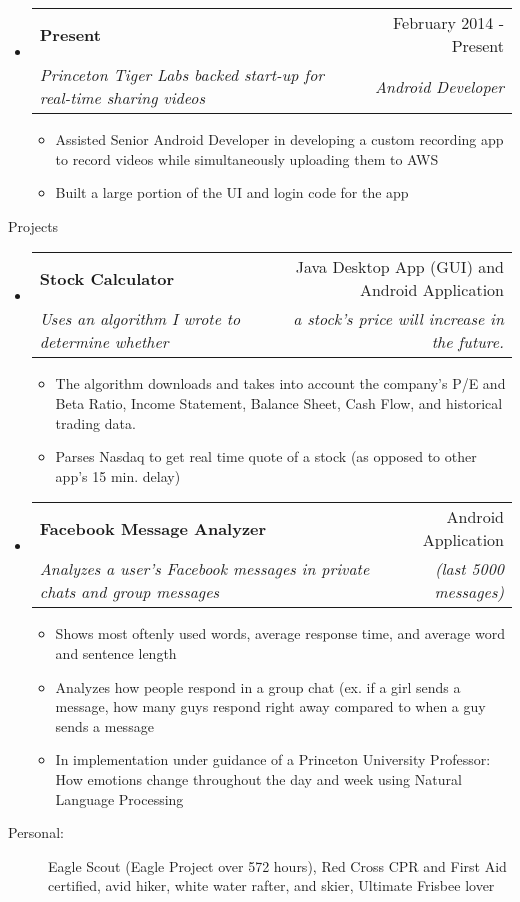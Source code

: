 \documentclass[letterpaper,11pt]{article}
\makeatletter
\newcommand{\resitem}[1]{\item #1 \vspace{-2pt}}
\newcommand{\resheading}[1]{{\large \parashade[.9]{sharpcorners}{\textbf{#1 \vphantom{p\^{E}}}}}}
\newcommand{\ressubheading}[4]{
\begin{tabular*}{6.5in}{l@{\extracolsep{\fill}}r}
		\textbf{#1} & #2 \\
		\textit{#3} & \textit{#4} \\
\end{tabular*}\vspace{-6pt}}
\makeatother
\begin{document}
\begin{itemize}
\item
	\ressubheading{Present}{February 2014 - Present}
		{Princeton Tiger Labs backed start-up for real-time 				sharing videos} {Android Developer}
		\begin {itemize}
		\resitem{Assisted Senior Android Developer in 						developing a custom recording app to record videos 				while simultaneously uploading them to AWS}
		\resitem{Built a large portion of the UI and login code 			for the app}
		\end{itemize}
\end{itemize}


\begin{description} 
	\item[Projects] 
\end{description}

\begin{itemize}

\item
	\ressubheading{Stock Calculator}{Java Desktop App (GUI) and 		Android Application}{Uses an algorithm I wrote to 				determine whether}{a stock's price will increase in the 		future.\space\space\space\space\space\space\space\space			\space}
	\begin{itemize}
		\resitem{The algorithm downloads and takes into account 			the company’s P/E and Beta Ratio, Income Statement, 			Balance Sheet, Cash Flow, and historical trading 					data.}
		\resitem{Parses Nasdaq to get real time quote of a 					stock (as opposed to other app's 15 min. delay)}
	\end{itemize}
	
\item
	\ressubheading{Facebook Message Analyzer}
		{Android Application}{Analyzes a user’s Facebook 					messages in private chats and group messages}{(last 				5000 messages)\space\space\space\space\space\space				\space\space\space}
	\begin{itemize}
		\resitem{Shows most oftenly used words, average 						response time, and average word and sentence 					length}
		\resitem{Analyzes how people respond in a group chat 					(ex. if a girl sends a message, how many guys 					respond right away compared to when a guy sends a 				message}
		\resitem{In implementation under guidance of a 						Princeton University Professor: How emotions change
			throughout the day and week using Natural Language 				Processing}
	\end{itemize}
\end{itemize}

\begin{description}
	\item[Personal:]Eagle Scout (Eagle Project over 572 hours), 		Red Cross CPR and First Aid certified, avid hiker, 				white water rafter, and skier, Ultimate Frisbee lover
\end{description}
\end{document}
